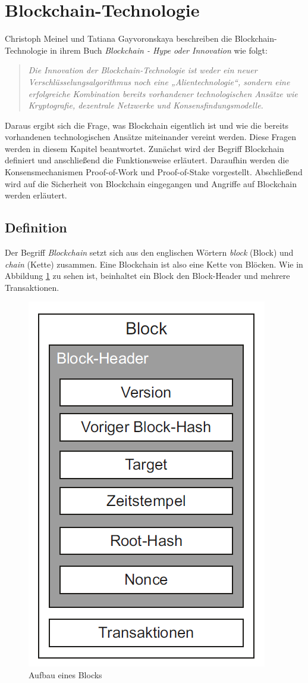 \section{Blockchain-Technologie}
\label{sec:blockchain_basics}


Christoph Meinel und Tatiana Gayvoronskaya beschreiben die Blockchain-Technologie in ihrem Buch \textit{Blockchain - Hype oder Innovation} wie folgt:

\begin{quote}
    \textit{Die Innovation der Blockchain-Technologie ist weder ein neuer Verschlüsselungsalgorithmus
    noch eine „Alientechnologie“, sondern eine erfolgreiche Kombination bereits
    vorhandener technologischen Ansätze wie Kryptografie, dezentrale Netzwerke und Konsensfindungsmodelle.}\parencite[S. 17]{Meinel_BlockchainHypeInnovation}
\end{quote}

\noindent Daraus ergibt sich die Frage, was Blockchain eigentlich ist und wie die bereits vorhandenen technologischen Ansätze miteinander vereint werden. Diese Fragen werden in diesem Kapitel beantwortet. Zunächst wird der Begriff Blockchain definiert und anschließend die Funktionsweise erläutert. Daraufhin werden die Konsensmechanismen Proof-of-Work und Proof-of-Stake vorgestellt. Abschließend wird auf die Sicherheit von Blockchain eingegangen und Angriffe auf Blockchain werden erläutert.

\subsection{Definition}
\label{subsec:blockchain_definition}

Der Begriff \textit{Blockchain} setzt sich aus den englischen Wörtern \textit{block} (Block) und \textit{chain} (Kette) zusammen. Eine Blockchain ist also eine Kette von Blöcken. Wie in Abbildung \ref{fig:blockchain} zu sehen ist, beinhaltet ein Block den Block-Header und mehrere Transaktionen. 

\begin{figure}[H]
    \centering
    \includegraphics[width=0.4\linewidth]{images/blockchain_block.png}
    \caption{Aufbau eines Blocks \parencite[S. 11]{Fill_BlockchainGrundlagen}}
    \label{fig:blockchain}
\end{figure}


